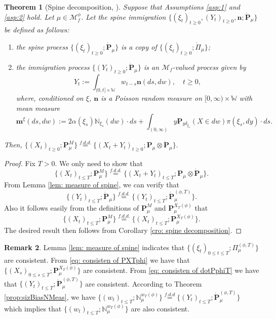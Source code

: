 \documentclass[UTF8]{pkuthss}
\theoremstyle{plain}
\newtheorem{thm}{Theorem}[section]
\theoremstyle{definition}
\newtheorem{rem}[thm]{Remark}
\numberwithin{equation}{section}
\begin{document}
\begin{thm}[{Spine decomposition, \cite{EckhoffKyprianouWinkel2015Spines, EnglanderKyprianou2004Local,LiuRenSong2009LlogL}}]
\label{thm:spinDec}
	Suppose that Assumptions \ref{asp:1} and \ref{asp:2} hold.
	Let $\mu \in \mathcal M_f^\phi$.
Let the spine immigration
	$\{(\xi_t)_{t\geq 0}, (Y_t)_{t\geq 0}, \mathbf n; \dot {\mathbf P}_\mu\}$ be defined as follows:
\begin{enumerate}
\item
	the \emph{spine process} $\{(\xi_t)_{t\geq 0}; \dot{\mathbf P}_\mu\}$ is a copy of $\{(\xi_t)_{t\geq 0}; \dot{\Pi}_{\mu}\}$;
\item
	the \emph{immigration process} $\{(Y_t)_{t\geq 0}; \dot{\mathbf P}_\mu\}$ is an $\mathcal M_f$-valued process given by
\[
	Y_t
	:= \int_{(0,t] \times \mathbb W} w_{t-s} \mathbf n(ds,dw),
	\quad t \geq 0,
\]
	where, conditioned on $\xi$, $\mathbf n$ is a Poisson random measure on $[0,\infty) \times \mathbb W$ with mean measure
\[
	\mathbf m^\xi(ds,dw)
:=  2 \alpha(\xi_s)\mathbb N_{\xi_s}(dw)\cdot ds
+ \int_{(0,\infty)} y \mathbf P_{y \delta_{\xi_s}}(X\in dw) \pi(\xi_s,dy)\cdot ds.
\]
\end{enumerate}
	Then,
$
    \{(X_t)_{t\geq 0}; \mathbf P_\mu^M\}
    \overset{f.d.d.}{=} \{(X_t + Y_t)_{t\geq 0}; \mathbf P_\mu \otimes\dot{\mathbf P}_\mu\}.
$
\end{thm}	

\begin{proof}
	Fix $T>0$.
	We only need to show that
\[
	\{(X_t)_{t\leq T}; \mathbf P_\mu^M\}
	\overset{f.d.d.}{=} \{(X_t + Y_t)_{t\leq T}; \mathbf P_\mu\otimes\dot{\mathbf P}_\mu\}.
\]
From Lemma \ref{lem: measure of spine},
	we can verify that
\begin{equation}
\label{eq: consisten of dotPphiT}
	\{(Y_t)_{t\leq T}; \dot{\mathbf P}_\mu\}
	\overset{f.d.d.}{=} \{(Y_t)_{t\leq T}; \dot{\mathbf P}^{(\phi,T)}_\mu\}.
\end{equation}
Also it follows easily from the definitions of $\mathbf P_\mu^M$ and $\mathbf P_\mu^{X_T(\phi)}$ that
\begin{equation}
\label{eq: consisten of PXTphi}
	\{(X_t)_{t\leq T}; \mathbf P_\mu^M\}
	\overset{f.d.d.}{=} \{(X_t)_{t\leq T}; \mathbf P_\mu^{X_T(\phi)}\}.	
\end{equation}
	The desired result then follows from Corollary \ref{cro: spine decomposition}.
\end{proof}
\begin{rem}
\label{rem: consistency}
	Lemma \ref{lem: measure of spine} indicates that $\{(\xi_t)_{0\leq t\leq T};\Pi_\mu^{(\phi, T)}\}$
		are consistent.
	From \eqref{eq: consisten of PXTphi} we have that $\{(X_s)_{0\leq s\leq T};\mathbf P_\mu^{X_T(\phi)}\}$
		are consistent.
	From \eqref{eq: consisten of dotPphiT} we have that $\{(Y_t)_{t\leq T}; \dot{\mathbf P}^{(\phi,T)}_\mu\}$
		are consistent.
	According to Theorem \ref{prop:sizBiasNMeas}, we have $\{(w_t)_{t\leq T}; \mathbb N^{w_T(\phi)}_\mu\} \overset{f.d.d}{=}\{(Y_t)_{t\leq T}; \dot{\mathbf P}^{(\phi,T)}_\mu\}$ which implies that $\{(w_t)_{t\leq T}; \mathbb N^{w_T(\phi)}_\mu\}$ are
	also consistent.
\end{rem}
\end{document}
